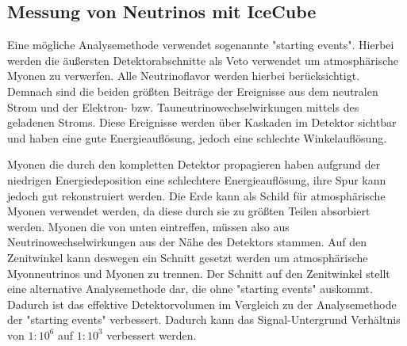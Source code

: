 \subsection{Messung von Neutrinos mit IceCube}
Eine mögliche Analysemethode verwendet sogenannte "starting events".
Hierbei werden die \"au\ss ersten Detektorabschnitte als Veto verwendet um atmosph\"arische Myonen zu verwerfen.
Alle Neutrinoflavor werden hierbei ber\"ucksichtigt.
Demnach sind die beiden gr\"o\ss ten Beitr\"age der Ereignisse aus dem neutralen Strom und der Elektron- bzw. Tauneutrinowechselwirkungen mittels des geladenen Stroms.
Diese Ereignisse werden \"uber Kaskaden im Detektor sichtbar und haben eine gute Energieaufl\"osung, jedoch eine schlechte Winkelaufl\"osung.

Myonen die durch den kompletten Detektor propagieren haben aufgrund der niedrigen Energiedeposition eine schlechtere Energieaufl\"osung, ihre Spur kann jedoch gut rekonstruiert werden.
Die Erde kann als Schild f\"ur atmosph\"arische Myonen verwendet werden, da diese durch sie zu gr\"o\ss ten Teilen absorbiert werden.
Myonen die von unten eintreffen, m\"ussen also aus Neutrinowechselwirkungen aus der Nähe des Detektors stammen.
Auf den Zenitwinkel kann deswegen ein Schnitt gesetzt werden um atmosphärische Myonneutrinos und Myonen zu trennen.
Der Schnitt auf den Zenitwinkel stellt eine alternative Analysemethode dar, die ohne "starting events" auskommt.
Dadurch ist das effektive Detektorvolumen im Vergleich zu der Analysemethode der "starting events" verbessert.
Dadurch kann das Signal-Untergrund Verh\"altnis von $1:10^6$ auf $1:10^3$ verbessert werden.
